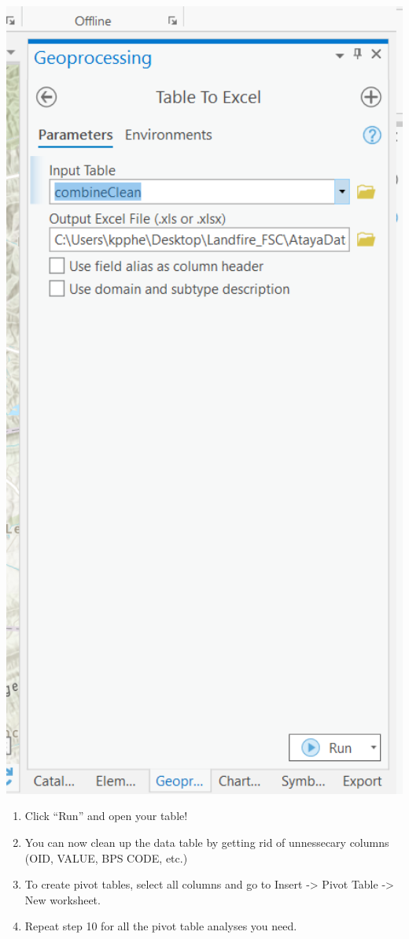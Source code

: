 \documentclass[
]{book}
\providecommand{\tightlist}{%
  \setlength{\itemsep}{0pt}\setlength{\parskip}{0pt}}
\begin{document}
\includegraphics[width=500pt]{04_gis_screenshots/20_Table_Excel}

\begin{enumerate}
\def\labelenumi{\arabic{enumi}.}
\setcounter{enumi}{7}
\tightlist
\item
  Click ``Run'' and open your table!
\item
  You can now clean up the data table by getting rid of unnessecary columns (OID, VALUE, BPS CODE, etc.)
\item
  To create pivot tables, select all columns and go to Insert -\textgreater{} Pivot Table -\textgreater{} New worksheet.
\item
  Repeat step 10 for all the pivot table analyses you need.
\end{enumerate}
\end{document}
